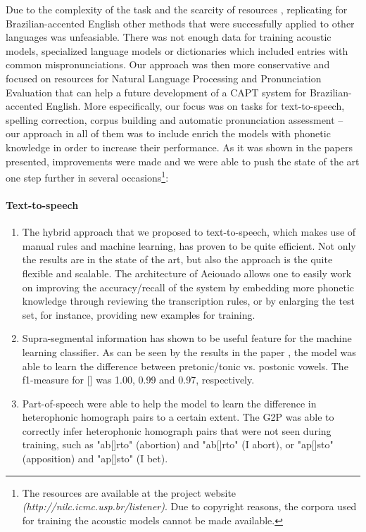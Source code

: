 Due to the complexity of the task and the scarcity of resources \cite{Neto2011}, replicating for Brazilian-accented English other methods that were successfully applied to other languages was unfeasiable. There was not enough data for training acoustic models, specialized language models or dictionaries which included entries with common mispronunciations. Our approach was then more conservative and focused on resources for Natural Language Processing and Pronunciation Evaluation that can help a future development of a \ac{CAPT} system for Brazilian-accented English. More especifically, our focus was on tasks for text-to-speech, spelling correction, corpus building and automatic pronunciation assessment -- our approach in all of them was to include enrich the models with phonetic knowledge in order to increase their performance. As it was shown in the papers presented, improvements were made and we were able to push the state of the art one step further in several occasions\footnote{The resources are available at the project website \emph{(http://nilc.icmc.usp.br/listener)}. Due to copyright reasons, the corpora used for training the acoustic models cannot be made available.}:

\paragraph*{Text-to-speech}
  \begin{enumerate}
    \item The hybrid approach that we proposed to text-to-speech, which makes use of manual rules and machine learning, has proven to be quite efficient. Not only the results are in the state of the art, but also the approach is the quite flexible and scalable. The architecture of Aeiouado allows one to easily work on improving the accuracy/recall of the system by embedding more phonetic knowledge through reviewing the transcription rules, or by enlarging the test set, for instance, providing new examples for training.
    \item Supra-segmental information has shown to be useful feature for the machine learning classifier. As can be seen by the results in the paper \cite{Mendonca2014}, the model was able to learn the difference between pretonic/tonic vs. postonic vowels. The f1-measure for [] was 1.00, 0.99 and 0.97, respectively.
    \item Part-of-speech were able to help the model to learn the difference in heterophonic homograph pairs to a certain extent. The G2P was able to correctly infer heterophonic homograph pairs that were not seen during training, such as "ab[]rto" (abortion) and "ab[]rto" (I abort), or "ap[]sto" (apposition) and "ap[]sto" (I bet).
  \end{enumerate}

